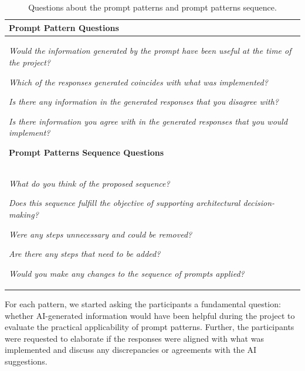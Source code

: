 \documentclass[runningheads]{llncs}
\begin{document}
\begin{table}[!ht]    
    \centering
    \caption{Questions about the prompt patterns and prompt patterns sequence.}
    \label{table:methodology}
    \begin{tabular}{p{4.8in}} 
        \toprule
        \hline                 
        \textbf{Prompt Pattern Questions} ~\\ \hline        
        \textit{Would the information generated by the prompt have been useful at the time of the project?}
        
        \noindent\textit{Which of the responses generated coincides with what was implemented?}
        
        \noindent\textit{Is there any information in the generated responses that you disagree with?}
        
        \noindent\textit{Is there information you agree with in the generated responses that you would implement?}
        
        \midrule        
        \textbf{Prompt Patterns Sequence Questions} ~\\ \hline
        \textit{What do you think of the proposed sequence?}
        
        \noindent\textit{Does this sequence fulfill the objective of supporting architectural decision-making?}
        
        \noindent\textit{Were any steps unnecessary and could be removed?}
        
        \noindent\textit{Are there any steps that need to be added?}
        
        \noindent\textit{Would you make any changes to the sequence of prompts applied?}
        \hline
        \bottomrule
    \end{tabular}    
\end{table}

For each pattern, we started asking the participants a fundamental question: whether AI-generated information would have been helpful during the project to evaluate the practical applicability of prompt patterns. Further, the participants were requested to elaborate if the responses were aligned with what was implemented and discuss any discrepancies or agreements with the AI suggestions.
\end{document}
